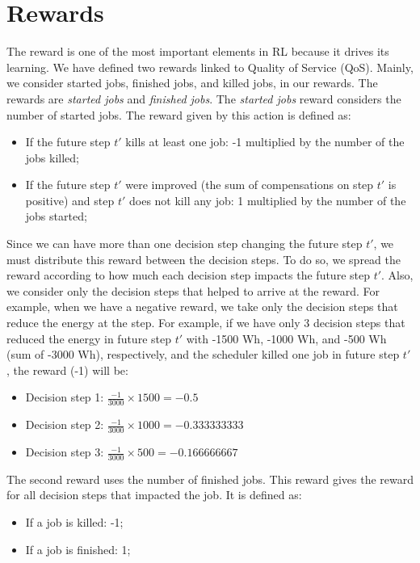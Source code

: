 \section{Rewards}

The reward is one of the most important elements in RL because it drives its learning. We have defined two rewards linked to Quality of Service (QoS). Mainly, we consider started jobs, finished jobs, and killed jobs, in our rewards. The rewards are \emph{started jobs} and \emph{finished jobs}. The \emph{started jobs} reward considers the number of started jobs. The reward given by this action is defined as:
\begin{itemize}
    \item If the future step $t'$ kills at least one job: -1 multiplied by the number of the jobs killed;
    \item If the future step $t'$ were improved (the sum of compensations on step $t'$ is positive) and step $t'$ does not kill any job: 1 multiplied by the number of the jobs started;
\end{itemize}

Since we can have more than one decision step changing the future step $t'$, we must distribute this reward between the decision steps. To do so, we spread the reward according to how much each decision step impacts the future step $t'$. Also, we consider only the decision steps that helped to arrive at the reward. For example, when we have a negative reward, we take only the decision steps that reduce the energy at the step. For example, if we have only 3 decision steps that reduced the energy in future step $t'$ with -1500 Wh, -1000 Wh, and -500 Wh (sum of -3000 Wh), respectively, and the scheduler killed one job in future step $t'$, the reward (-1) will be:
\begin{itemize}
    \item Decision step 1: \(\frac{-1}{3000} \times 1500 = -0.5\)
    \item Decision step 2: \(\frac{-1}{3000} \times 1000 = -0.333333333\)
    \item Decision step 3: \(\frac{-1}{3000} \times 500 = -0.166666667\)
\end{itemize}

The second reward uses the number of finished jobs. This reward gives the reward for all decision steps that impacted the job. It is defined as:
\begin{itemize}
    \item If a job is killed: -1;
    \item If a job is finished: 1;
\end{itemize}

